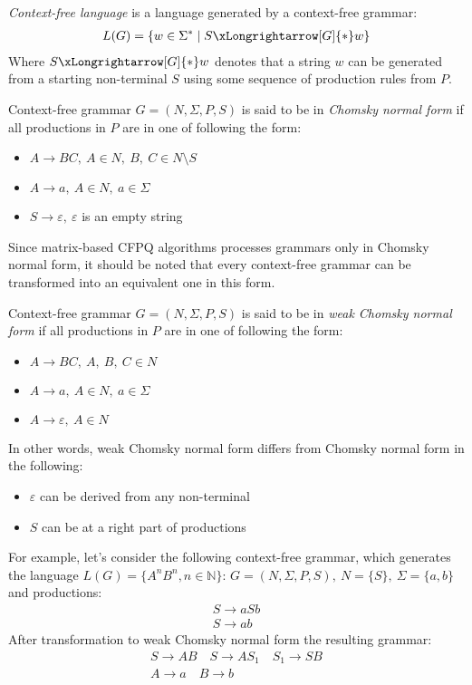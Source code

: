 \begin{definition} \emph{Context-free language} is a language generated by a context-free grammar:
\begin{align*}
     L(G) = \{w \in \Sigma^* \mid S \xLongrightarrow[G]{*} w \} 
\end{align*}
Where $S \xLongrightarrow[G]{*} w$  denotes that a string $w$ can be generated from a starting non-terminal $S$ using some sequence of production rules from $P$.
\end{definition}
\begin{definition} Context-free grammar $G = (N, \Sigma, P, S)$ is said to be in \emph{Chomsky normal form} if all productions in $P$ are in one of following the form:
    \begin{itemize}
        \item $A \rightarrow BC,~A \in N,~B,~C \in N \setminus S$
        \item  $A \rightarrow a,~A \in N,~a \in \Sigma$
        \item $S \rightarrow \varepsilon,~\varepsilon$ is an empty string
    \end{itemize}
\end{definition}
 Since matrix-based CFPQ algorithms processes grammars only in Chomsky normal form, it should be noted that every context-free grammar can be transformed into an equivalent one in this form. 
\begin{definition} Context-free grammar $G = (N, \Sigma, P, S)$ is said to be in \emph{weak Chomsky normal form} if all productions in $P$ are in one of following the form:
    \begin{itemize}
        \item $A \rightarrow BC,~A,~B,~C \in N$
        \item  $A \rightarrow a,~A \in N,~a \in \Sigma$
        \item $A \rightarrow \varepsilon,~A \in N$
    \end{itemize}
\end{definition}
In other words, weak Chomsky normal form differs from Chomsky normal form in the following:
\begin{itemize}
    \item $\varepsilon$ can be derived from any non-terminal
    \item $S$ can be at a right part of productions
\end{itemize}
    
    
For example, let's consider the following context-free grammar, which generates the language $L(G) = \{A^nB^n, n \in \mathbb{N}\}$:
$G=(N, \Sigma, P, S), ~N=\{S\},~\Sigma=\{a,b\}$ and productions: 
\begin{align*}
S \rightarrow aSb\\
S \rightarrow ab
\end{align*}
After transformation to weak Chomsky normal form the resulting grammar:
\begin{gather*}
S \rightarrow AB  \quad S \rightarrow AS_1 \quad S_1 \rightarrow SB \\
A \rightarrow a \quad B \rightarrow b \quad
\end{gather*}

